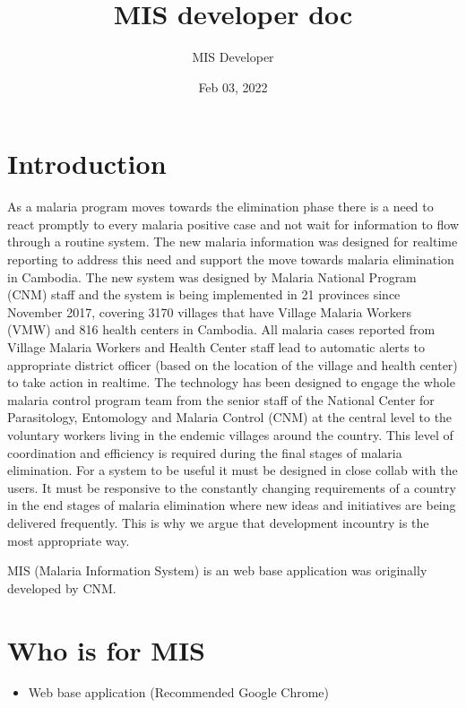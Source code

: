 \documentclass[letterpaper,10pt,english,openany,oneside]{sphinxmanual}
\title{MIS developer doc}
\date{Feb 03, 2022}
\author{MIS Developer}
\let\sphinxpxdimen\pdfpxdimen\else\newdimen\sphinxpxdimen
\begin{document}
\pagestyle{empty}
\sphinxmaketitle
\pagestyle{plain}
\sphinxtableofcontents
\pagestyle{normal}
\label{\detokenize{index::doc}}



\chapter{Introduction}
\label{\detokenize{about/about-mis:introduction}}\label{\detokenize{about/about-mis::doc}}
\noindent{\hspace*{\fill}\sphinxincludegraphics[width=100\sphinxpxdimen]{{cnm}.png}\hspace*{\fill}}

\sphinxAtStartPar
As a malaria program moves towards the elimination phase there is a need to react promptly to every malaria positive case and not wait for information to flow through a routine system. The new malaria information was designed for real\sphinxhyphen{}time reporting to address this need and support the move towards malaria elimination in Cambodia.
The new system was designed by Malaria National Program (CNM) staff and the system is being implemented in 21 provinces since November 2017, covering 3170 villages that have Village Malaria Workers (VMW) and 816 health centers in Cambodia. All malaria cases reported from Village Malaria Workers and Health Center staff lead to automatic alerts to appropriate district officer (based on the location of the village and health center) to take action in real\sphinxhyphen{}time.
The technology has been designed to engage the whole malaria control program team from the senior staff of the National Center for Parasitology, Entomology and Malaria Control (CNM) at the central level to the voluntary workers living in the endemic villages around the country. This level of coordination and efficiency is required during the final stages of malaria elimination.
For a system to be useful it must be designed in close collab with the users. It must be responsive to the constantly changing requirements of a country in the end stages of malaria elimination where new ideas and initiatives are being delivered frequently. This is why we argue that development in\sphinxhyphen{}country is the most appropriate way.

\sphinxAtStartPar
MIS (Malaria Information System) is an web base application was originally developed by CNM.


\chapter{Who is for MIS}
\label{\detokenize{about/about-mis:who-is-for-mis}}\begin{itemize}
\item {} 
\sphinxAtStartPar
Web base application (Recommended Google Chrome)

\end{itemize}
\end{document}
